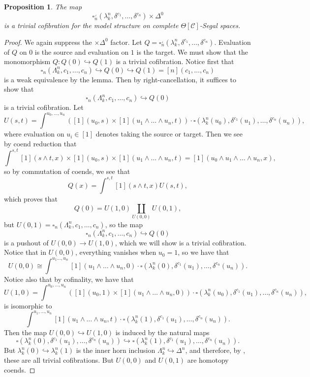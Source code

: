 \documentclass[a4paper]{article}
\numberwithin{equation}{subsection}
\theoremstyle{plain}   %
\newtheorem{prop}[equation]{Proposition}
\theoremstyle{definition}
\theoremstyle{remark}
\theoremstyle{plain}
\providecommand{\C}{}
\renewcommand{\C}{\ensuremath{\mathcal{C}}}
\begin{document}
\begin{prop} The map 
	\[\square_n^\lrcorner(\lambda^n_k,\delta^{c_1},\dots,\delta^{c_n})\times \Delta^0\] is a trivial cofibration for the model structure on complete \(\Theta[\C]\)-Segal spaces.   
\end{prop}
\begin{proof} 
	We again suppress the \(\times \Delta^0\) factor. Let \(Q=\square_n^\lrcorner(\lambda^n_k,\delta^{c_1},\dots,\delta^{c_n})\).  Evaluation of \(Q\) on \(0\) is the source and evaluation on \(1\) is the target. We must show that the monomorphism \(Q:Q(0)\hookrightarrow Q(1)\) is a trivial cofibration. Notice first that 
	\[\square_n(\Lambda^n_k, c_1,\dots,c_n)\hookrightarrow Q(0) \hookrightarrow Q(1) = [n](c_1,\dots,c_n)\] is a weak equivalence by the lemma.  Then by right-cancellation, it suffices to show that 
	\[\square_n(\Lambda^n_k, c_1,\dots,c_n)\hookrightarrow Q(0)\] is a trivial cofibration.
	Let 
	\[U(s,t)=\int^{u_0,\dots,u_n} \left([1](u_0,s) \times [1](u_1\wedge\dots\wedge u_n,t)\right)\cdot \square(\lambda^n_k(u_0),\delta^{c_1}(u_1),\dots, \delta^{c_n}(u_n)),\]
	where evaluation on \(u_i\in [1]\) denotes taking the source or target.  
	Then we see by coend reduction that
	\[\int^{s,t} [1](s\wedge t,x) \times [1](u_0,s) \times [1](u_1\wedge\dots\wedge u_n,t) = [1](u_0 \wedge u_1 \wedge \dots\wedge u_n,x),\]
	so by commutation of coends, we see that
	\[Q(x)=\int^{s,t} [1](s\wedge t,x) U(s,t),\]
	which proves that \[Q(0)=U(1,0) \coprod_{U(0,0)} U(0,1),\]
	but \(U(0,1)=\square_n(\Lambda^n_k, c_1,\dots,c_n)\), so the map 
	\[\square_n(\Lambda^n_k, c_1,\dots,c_n) \hookrightarrow Q(0)\] is a pushout of \(U(0,0)\to U(1,0)\), which we will show is a trivial cofibration.  Notice that in \(U(0,0)\), everything vanishes when \(u_0=1\), so we have that 
	\[U(0,0)\cong\int^{u_1\dots,u_n} [1](u_1\wedge\dots\wedge u_n,0)\cdot \square(\lambda^n_k(0),\delta^{c_1}(u_1),\dots, \delta^{c_n}(u_n)).\]
	Notice also that by cofinality, we have that 
	\[U(1,0)=\int^{u_0,\dots,u_n} \left([1](u_0,1) \times [1](u_1\wedge\dots\wedge u_n,0)\right)\cdot \square(\lambda^n_k(u_0),\delta^{c_1}(u_1),\dots, \delta^{c_n}(u_n)),\]
	is isomorphic to 
	\[\int^{u_1,\dots,u_n} [1](u_1\wedge\dots\wedge u_n,t)\cdot \square(\lambda^n_k(1),\delta^{c_1}(u_1),\dots, \delta^{c_n}(u_n)).\]
	Then the map \(U(0,0)\hookrightarrow U(1,0)\) is induced by the natural maps
	\[\square(\lambda^n_k(0),\delta^{c_1}(u_1),\dots,\delta^{c_n}(u_n)) \hookrightarrow \square(\lambda^n_k(1),\delta^{c_1}(u_1),\dots,\delta^{c_n}(u_n)).\]
	But \(\lambda^n_k(0)\hookrightarrow \lambda^n_k(1)\) is the inner horn inclusion \(\Lambda^n_k\hookrightarrow \Delta^n\), and therefore, by , these are all trivial cofibrations.  But \(U(0,0)\) and \(U(0,1)\) are homotopy coends.
	

\end{proof}
\end{document}
